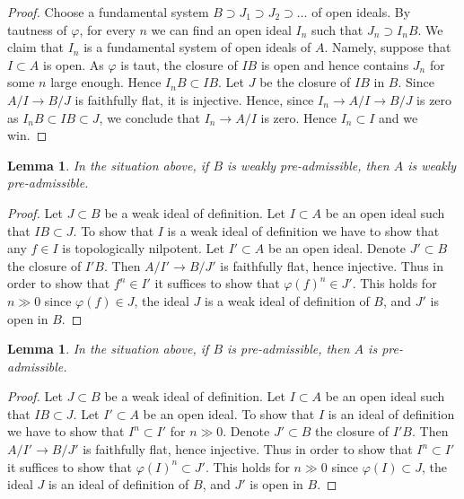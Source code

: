 \documentclass{stacks-project}
\theoremstyle{plain}
\newtheorem{lemma}[subsection]{Lemma}
\theoremstyle{definition}
\theoremstyle{remark}
\numberwithin{equation}{subsection}
\begin{document}
\begin{proof}
Choose a fundamental system $B \supset J_1 \supset J_2 \supset \ldots$
of open ideals. By tautness of $\varphi$, for every $n$ we can find an
open ideal $I_n$ such that $J_n \supset I_nB$. We claim that
$I_n$ is a fundamental system of open ideals of $A$.
Namely, suppose that $I \subset A$ is open. As $\varphi$ is taut,
the closure of $IB$ is open and hence contains $J_n$ for some $n$
large enough. Hence $I_nB \subset IB$. Let $J$ be the closure of
$IB$ in $B$. Since $A/I \to B/J$ is faithfully flat, it is injective.
Hence, since $I_n \to A/I \to B/J$ is zero as $I_nB \subset IB \subset J$,
we conclude that $I_n \to A/I$ is zero. Hence $I_n \subset I$ and
we win.
\end{proof}

\begin{lemma}
\label{lemma-taut-descent-weakly-admissible}
In the situation above, if $B$ is weakly pre-admissible, then
$A$ is weakly pre-admissible.
\end{lemma}

\begin{proof}
Let $J \subset B$ be a weak ideal of definition. Let $I \subset A$
be an open ideal such that $IB \subset J$. To show that $I$ is a weak ideal
of definition we have to show that any $f \in I$ is topologically nilpotent.
Let $I' \subset A$ be an open ideal. Denote $J' \subset B$ the closure
of $I'B$. Then $A/I' \to B/J'$ is faithfully flat, hence injective.
Thus in order to show that $f^n \in I'$ it suffices to show
that $\varphi(f)^n \in J'$. This holds for $n \gg 0$ since
$\varphi(f) \in J$, the ideal $J$ is a weak ideal of definition of $B$,
and $J'$ is open in $B$.
\end{proof}

\begin{lemma}
\label{lemma-taut-descent-admissible}
In the situation above, if $B$ is pre-admissible, then $A$
is pre-admissible.
\end{lemma}

\begin{proof}
Let $J \subset B$ be a weak ideal of definition. Let $I \subset A$
be an open ideal such that $IB \subset J$. Let $I' \subset A$ be an open ideal.
To show that $I$ is an ideal of definition we have to show that
$I^n \subset I'$ for $n \gg 0$. Denote $J' \subset B$ the closure
of $I'B$. Then $A/I' \to B/J'$ is faithfully flat, hence injective.
Thus in order to show that $I^n \subset I'$ it suffices to show
that $\varphi(I)^n \subset J'$. This holds for $n \gg 0$ since
$\varphi(I) \subset J$, the ideal $J$ is an ideal of definition of $B$,
and $J'$ is open in $B$.
\end{proof}
\end{document}
